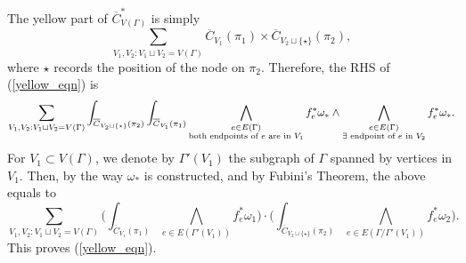 \documentclass[11pt]{article}
\theoremstyle{definition}
\theoremstyle{remark}
\def\ov#1{\overline{#1}}
\def\tn#1{\textnormal{#1}}
\begin{document}
The yellow part of $\ov{C}^*_{V(\Gamma)}$ is simply
$$\sum_{V_1,V_2:V_1\sqcup V_2=V(\Gamma)}
\ov{C}_{V_1}(\pi_1)\times\ov{C}_{V_2\sqcup\{\star\}}(\pi_2),
$$
where $\star$ records the position of the node on $\pi_2$.
Therefore, the RHS of (\ref{yellow_eqn}) is
$$\sum_{V_1,V_2:V_1\sqcup V_2=V(\Gamma)}
\int_{\ov{C}_{V_2\sqcup\{\star\}}(\pi_2)}\int_{\ov{C}_{V_1}(\pi_1)}
\bigwedge_{\begin{subarray}{c}e\in E(\Gamma)\\\tn{both endpoints of }e\tn{ are in }V_1\end{subarray}}f_e^*{\omega_*}\wedge
\bigwedge_{\begin{subarray}{c}e\in E(\Gamma)\\ \exists\tn{ endpoint of }e\tn{ in }V_2\end{subarray}}f_e^*{\omega_*}. 
$$ 
For $V_1\subset V(\Gamma)$, we denote by $\Gamma'(V_1)$ the subgraph of $\Gamma$ spanned by vertices in $V_1$. Then, by the way $\omega_*$ is constructed, and by Fubini's Theorem, 
the above equals to 
$$\sum_{V_1,V_2:V_1\sqcup V_2=V(\Gamma)}
\Big(\int_{\ov{C}_{V_1}(\pi_1)}
\bigwedge_{e\in E(\Gamma'(V_1))} 
f_e^*{\omega_1}\Big)
\cdot
\Big(\int_{\ov{C}_{V_2\sqcup\{\star\}}(\pi_2)}
\bigwedge_{e\in E(\Gamma/\Gamma'(V_1))}
f_e^*{\omega_2}\Big). 
$$ 
This proves (\ref{yellow_eqn}). 
\end{document}
